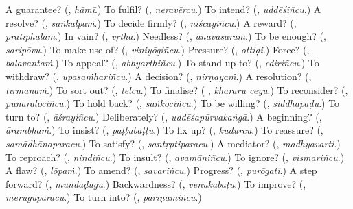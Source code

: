 \begin{tcolorbox}[breakable,colback=teal!4,colframe=teal!35!black,title={Before you move on}]
A guarantee? (\textbf{}, \emph{hāmī}.) To fulfil? (\textbf{}, \emph{neravērcu}.) To intend? (\textbf{}, \emph{uddēśiñcu}.) A resolve? (\textbf{}, \emph{saṅkalpaṁ}.) To decide firmly? (\textbf{}, \emph{niścayiñcu}.) A reward? (\textbf{}, \emph{pratiphalaṁ}.) In vain? (\textbf{}, \emph{vṛthā}.) Needless? (\textbf{}, \emph{anavasaraṁ}.) To be enough? (\textbf{}, \emph{saripōvu}.) To make use of? (\textbf{}, \emph{viniyōgiñcu}.) Pressure? (\textbf{}, \emph{ottiḍi}.) Force? (\textbf{}, \emph{balavantaṁ}.) To appeal? (\textbf{}, \emph{abhyarthiñcu}.) To stand up to? (\textbf{}, \emph{ediriñcu}.) To withdraw? (\textbf{}, \emph{upasaṁhariñcu}.) A decision? (\textbf{}, \emph{nirṇayaṁ}.) A resolution? (\textbf{}, \emph{tīrmānaṁ}.) To sort out? (\textbf{}, \emph{tēlcu}.) To finalise? (\textbf{ }, \emph{kharāru cēyu}.) To reconsider? (\textbf{}, \emph{punarālōciñcu}.) To hold back? (\textbf{}, \emph{saṅkōciñcu}.) To be willing? (\textbf{}, \emph{siddhapaḍu}.) To turn to? (\textbf{}, \emph{āśrayiñcu}.) Deliberately? (\textbf{}, \emph{uddēśapūrvakaṅgā}.) A beginning? (\textbf{}, \emph{ārambhaṁ}.) To insist? (\textbf{}, \emph{paṭṭubaṭṭu}.) To fix up? (\textbf{}, \emph{kudurcu}.) To reassure? (\textbf{}, \emph{samādhānaparacu}.) To satisfy? (\textbf{}, \emph{santṛptiparacu}.) A mediator? (\textbf{}, \emph{madhyavarti}.) To reproach? (\textbf{}, \emph{nindiñcu}.) To insult? (\textbf{}, \emph{avamāniñcu}.) To ignore? (\textbf{}, \emph{vismariñcu}.) A flaw? (\textbf{}, \emph{lōpaṁ}.) To amend? (\textbf{}, \emph{savariñcu}.) Progress? (\textbf{}, \emph{purōgati}.) A step forward? (\textbf{}, \emph{mundaḍugu}.) Backwardness? (\textbf{}, \emph{venukabāṭu}.) To improve? (\textbf{}, \emph{meruguparacu}.) To turn into? (\textbf{}, \emph{pariṇamiñcu}.)
\end{tcolorbox}
